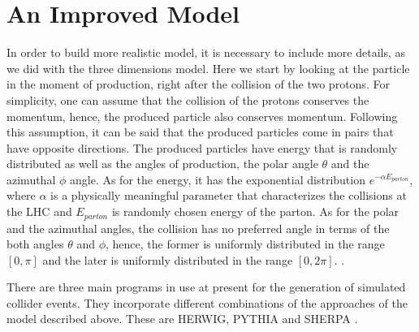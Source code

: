 \section{An Improved Model}
In order to build more realistic model, it is necessary to include more details, as we did with the three dimensions model. Here we start by looking at the particle in the moment of production, right after the collision of the two protons. For simplicity, one can assume that the collision of the protons conserves the momentum, hence, the produced particle also conserves momentum.
Following this assumption, it can be said that the produced particles come in pairs that have opposite directions. The produced particles have energy that is randomly distributed as well as the angles of production, the polar angle $\theta$ and the azimuthal $\phi$ angle. As for the energy, it has the exponential distribution $e^{- \alpha E_{parton}}$, where $\alpha$ is a physically meaningful parameter that characterizes the collisions at the LHC and $E_{parton}$ is randomly chosen energy of the parton. As for the polar and the azimuthal angles, the collision has no preferred angle in terms of the both angles $\theta$ and $\phi$,
hence, the former is uniformly distributed in the range $[0, \pi]$ and the later is uniformly distributed in the range $[0,2 \pi]$. \citep{Salam:2010zt}.  
%


There are three main programs in use at present for the generation of simulated collider events. They incorporate different combinations of the approaches of the model described above. These are HERWIG, PYTHIA and SHERPA \citep{Buckley:2011ms}.      